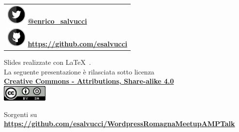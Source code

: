 \documentclass[graphic, aspectratio=169]{beamer}
\begin{document}
\begin{frame}

\begin{center}
\begin{tabular}{>{\centering\arraybackslash}p{4cm}}
\includegraphics[height=1cm]{images/twitter_logo.png} \textbf{\href{https://twitter.com/enrico_salvucci}{ @enrico\_salvucci}} \\
\includegraphics[height=1cm]{images/github_logo.png} \textbf{\href{https://github.com/esalvucci}{https://github.com/esalvucci}} \\
\end{tabular}

\bigskip
\begin{footnotesize}
Slides realizzate con \LaTeX\ .\\
La seguente presentazione \`e rilasciata sotto licenza\\
\textbf{\href{http://creativecommons.org/licenses/by-sa/4.0/}{Creative Commons - Attributions, Share-alike 4.0}}\\

\medskip
\includegraphics[height=0.8cm]{images/cc.png}

\medskip
Sorgenti su \textbf{\url{https://github.com/esalvucci/WordpressRomagnaMeetupAMPTalk}}
\end{footnotesize}
\end{center}
\end{frame}
\end{document}
